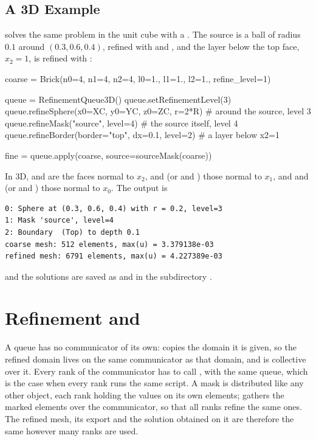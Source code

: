 \subsection{A 3D Example}
 solves the same problem in the unit cube with a
. The source is a ball of radius $0.1$ around
$(0.3,0.6,0.4)$, refined with  and ,
and the layer below the top face, $x_2=1$, is refined with
:
\begin{python}
coarse = Brick(n0=4, n1=4, n2=4, l0=1., l1=1., l2=1., refine_level=1)

queue = RefinementQueue3D()
queue.setRefinementLevel(3)
queue.refineSphere(x0=XC, y0=YC, z0=ZC, r=2*R)      # around the source, level 3
queue.refineMask("source", level=4)                 # the source itself, level 4
queue.refineBorder(border="top", dx=0.1, level=2)   # a layer below x2=1

fine = queue.apply(coarse, source=sourceMask(coarse))
\end{python}
In 3D,  and  are the faces normal to $x_2$,
 and  (or  and ) those
normal to $x_1$, and  and  (or  and
) those normal to $x_0$. The output is
\begin{verbatim}
0: Sphere at (0.3, 0.6, 0.4) with r = 0.2, level=3
1: Mask 'source', level=4
2: Boundary  (Top) to depth 0.1
coarse mesh: 512 elements, max(u) = 3.379138e-03
refined mesh: 6791 elements, max(u) = 4.227389e-03
\end{verbatim}
and the solutions are saved as  and
 in the subdirectory .

\section{Refinement and \MPI}\label{sec:oxley:mpi}
A queue has no communicator of its own:  copies the domain it is
given, so the refined domain lives on the same communicator as that domain,
and  is collective over it. Every rank of the communicator has
to call , with the same queue, which is the case when every rank
runs the same script. A mask is distributed like any other \Data object, each
rank holding the values on its own elements;  gathers the marked
elements over the communicator, so that all ranks refine the same ones. The
refined mesh, its \finley export and the solution obtained on it are
therefore the same however many ranks are used.

